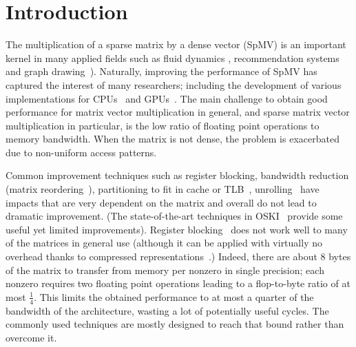 \documentclass{sig-alternate}
\def\ge#1{{#1}}
\def\NOTE#1{{}}
\begin{document}
\section{Introduction}
The multiplication of a sparse matrix by a dense vector (SpMV) is an
important kernel in many applied fields such as fluid dynamics 
\cite{journals/tog/BolzFGS03}, recommendation systems~\cite{Brin98} and graph
drawing~\cite{Koren05}). Naturally, improving the performance of SpMV has
captured the interest of many researchers; including the development of
various implementations for 
CPUs~\cite{Buluc2009SPAA,Williams07} and GPUs~\cite{Bell08,
  conf/ipps/KreutzerHWFBB12,
  journals/concurrency/VazquezFG11,kumar2012accelerating}. \ge{The main
challenge  to obtain good performance for matrix vector multiplication in general, and 
sparse matrix vector multiplication in particular, is the low ratio of floating point operations
to memory bandwidth. When the matrix is not dense, the problem is exacerbated due to non-uniform 
access patterns.}

\NOTE{I rewrote last few sentences: write more precisely? Blas 2 is Matrix/vector, and that is still somewhat memory bound.}

Common improvement techniques such as register blocking, bandwidth
reduction (matrix reordering~\cite{Cuthill69}), partitioning to fit in
cache or TLB~\cite{Nishtala07,Temam:1992:CBS:147877.148091,conf/ppsc/Toledo97},
unrolling~\cite{Mellor-Crummey04} have impacts that are very
dependent on the matrix and overall do not lead to dramatic
improvement. (The state-of-the-art techniques in OSKI~\cite{Vuduc05}
provide some useful yet limited improvements). Register blocking~\cite{conf/ppsc/Toledo97} does
not work well to many of the matrices in general use (although it can be applied
with virtually no overhead thanks to compressed
representations~\cite{Buluc11}.) Indeed, there are about 8 bytes of the matrix to transfer
from memory 
per nonzero in single precision; each nonzero requires two
floating point operations leading to a flop-to-byte ratio of at most
$\frac{1}{4}$. This limits the obtained performance to at most a
quarter of the bandwidth of the architecture, wasting a lot of
potentially useful cycles. The commonly used techniques are mostly
designed to reach that bound rather than overcome it.
\end{document}
